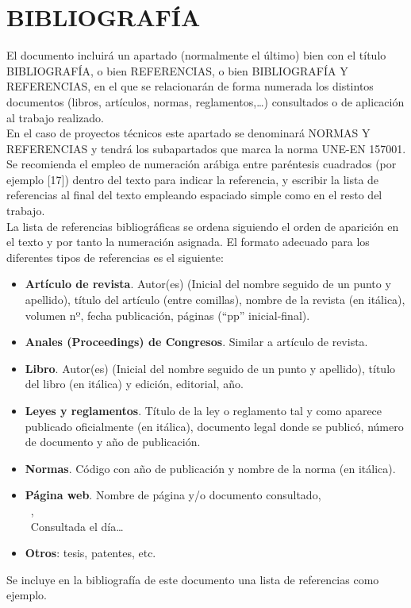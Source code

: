 \section{BIBLIOGRAFÍA} \label{sec:bibliografia}
El documento incluirá un apartado (normalmente el último) bien con el título BIBLIOGRAFÍA, o bien REFERENCIAS, o bien BIBLIOGRAFÍA Y REFERENCIAS, en el que se relacionarán de forma numerada los distintos documentos (libros, artículos, normas, reglamentos,…) consultados o de aplicación al trabajo realizado.\\

En el caso de proyectos técnicos este apartado se denominará NORMAS Y REFERENCIAS y tendrá los subapartados que marca la norma UNE-EN 157001.\\

Se recomienda el empleo de numeración arábiga entre paréntesis cuadrados (por ejemplo [17]) dentro del texto para indicar la referencia, y escribir la lista de referencias al final del texto empleando espaciado simple como en el resto del trabajo.\\

La lista de referencias bibliográficas se ordena siguiendo el orden de aparición en el texto y por tanto la numeración asignada.
El formato adecuado para los diferentes tipos de referencias es el siguiente:
\begin{itemize}
\item \textbf{Artículo de revista}. Autor(es) (Inicial del nombre seguido de un punto y apellido), título del artículo (entre comillas), nombre de la revista (en itálica), volumen nº, fecha publicación, páginas (“pp” inicial-final).
\item \textbf{Anales (Proceedings) de Congresos}. Similar a artículo de revista.
\item \textbf{Libro}. Autor(es) (Inicial del nombre seguido de un punto y apellido), título del libro (en itálica) y edición, editorial, año.
\item \textbf{Leyes y reglamentos}. Título de la ley o reglamento tal y como aparece publicado oficialmente (en itálica), documento legal donde se publicó, número de documento y año de publicación.
\item \textbf{Normas}. Código con año de publicación y nombre de la norma (en itálica).
\item \textbf{Página web}. Nombre de página y/o documento consultado,\\
\ <dirección de internet>,\\
\ Consultada el día…
\item \textbf{Otros}: tesis, patentes, etc.
\end{itemize}

Se incluye en la bibliografía de este documento una lista de referencias como ejemplo. 


